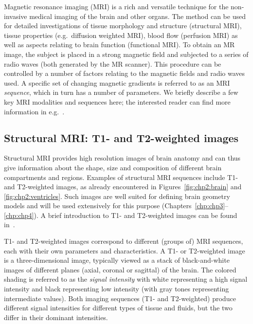 Magnetic resonance imaging (MRI) is a rich and versatile technique for
the non-invasive medical imaging of the brain and other organs. The method
can be used for detailed investigations of tissue morphology and
structure (structural MRI), tissue properties (e.g.~diffusion weighted MRI),
blood flow (perfusion MRI) as well as aspects relating to brain
function (functional MRI). To obtain an MR image, the subject is
placed in a strong magnetic field and subjected to a series of radio
waves (both generated by the MR scanner). This procedure can be
controlled by a number of factors relating to the magnetic fields and
radio waves used. A specific set of changing magnetic gradients is
referred to as an MRI \emph{sequence}, which in turn has a number of
parameters. We briefly describe a few key MRI modalities and sequences
here; the interested reader can find more information in
e.g.~\cite{haacke1999magnetic, payne2017cerebral, alexander2007diffusion}.

\subsection{Structural MRI: T1- and T2-weighted images}
\label{sec:T1T2}

Structural MRI provides high resolution images of brain anatomy and
can thus give information about the shape, size and composition of
different brain compartments and regions. Examples of structural MRI
sequences include T1- and T2-weighted images, as already
encountered in Figures~\ref{fig:chp2:brain} and
\ref{fig:chp2:ventricles}. Such images are well suited for defining
brain geometry models and will be used extensively for this purpose
(Chapters~\ref{chp:chp3}--\ref{chp:chp4}). A brief introduction to T1-
and T2-weighted images can be found in~\cite{pooley2005fundamental}.

T1- and T2-weighted images correspond to different (groups of) MRI
sequences, each with their own parameters and characteristics. A T1-
or T2-weighted image is a three-dimensional image, typically viewed as
a stack of black-and-white images of different planes (axial, coronal
or sagittal) of the brain. The colored shading is referred to as the
\emph{signal intensity} with white representing a high signal
intensity and black representing low intensity (with gray tones
representing intermediate values). Both imaging sequences (T1- and
T2-weighted) produce different signal intensities for different types of
tissue and fluids, but the two differ in their dominant intensities.

